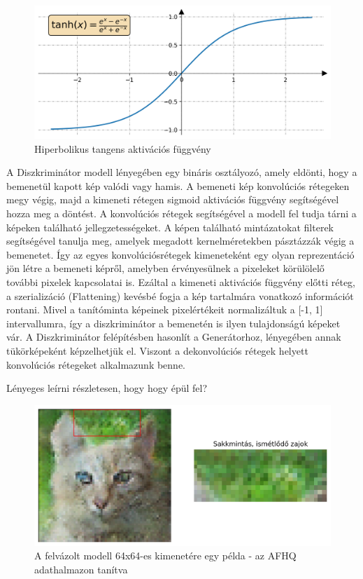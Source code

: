 \begin{figure}[h]
\centering
\includegraphics[width=12cm]{images/tanh.png}
\caption{Hiperbolikus tangens aktivációs függvény}
\label{fig:tanh}
\end{figure}


A Diszkriminátor modell lényegében egy bináris osztályozó, amely eldönti, hogy a bemenetül kapott kép valódi vagy hamis. A bemeneti kép konvolúciós rétegeken megy végig, majd a kimeneti rétegen sigmoid aktivációs függvény segítségével hozza meg a döntést. A konvolúciós rétegek segítségével a modell fel tudja tárni a képeken található jellegzetességeket. A képen található mintázatokat filterek segítségével tanulja meg, amelyek megadott kernelméretekben pásztázzák végig a bemenetet. Így az egyes konvolúciósrétegek kimeneteként egy olyan reprezentáció jön létre a bemeneti képről, amelyben érvényesülnek a pixeleket körülölelő további pixelek kapcsolatai is. Ezáltal a kimeneti aktivációs függvény előtti réteg, a szerializáció (Flattening) kevésbé fogja a kép tartalmára vonatkozó információt rontani. Mivel a tanítóminta képeinek pixelértékeit normalizáltuk a [-1, 1] intervallumra, így a diszkriminátor a bemenetén is ilyen tulajdonságú képeket vár. A Diszkriminátor felépítésben hasonlít a Generátorhoz, lényegében annak tükörképeként képzelhetjük el. Viszont a dekonvolúciós rétegek helyett konvolúciós rétegeket alkalmazunk benne.

Lényeges leírni részletesen, hogy hogy épül fel?


\begin{figure}[h]
\centering
\includegraphics[width=13cm]{images/chessboard-patterns.png}
\caption{A felvázolt modell 64x64-es kimenetére egy példa - az AFHQ adathalmazon tanítva}
\label{fig:chessboard}
\end{figure}

